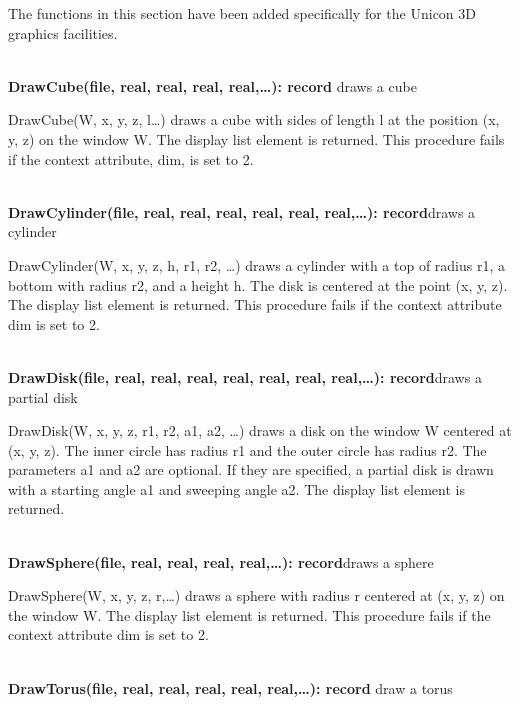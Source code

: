 \documentclass[letterpaper]{article}
\begin{document}
The functions in this section have been added specifically for the
Unicon 3D graphics facilities.

\noindent\hrulefill\\
\noindent\textsf{\textbf{DrawCube(file, real, real, real, real,{\dots}): record}} \hfill draws a cube


\bigskip

{
\textsf{DrawCube(W, x, y, z, l{\dots}) }draws a cube with sides of length l at the position (x, y, z) on the window W.
The display list element is returned. This procedure fails if the context attribute, dim, is set to 2. }


\noindent\hrulefill\\
\noindent\textsf{\textbf{DrawCylinder(file, real, real, real, real,
real, real,{\dots}): record}}\hfill draws a cylinder


\bigskip

\textsf{DrawCylinder(W, x, y, z, h, r1, r2, {\dots})} draws a
cylinder with a top of radius r1, a bottom with radius r2, and a
height h. The disk is centered at the point (x, y, z). The display
list element is returned. This procedure fails if the context
attribute dim is set to 2.

\noindent\hrulefill\\
\noindent\textsf{\textbf{DrawDisk(file, real, real, real, real, real,
	real, real,\dots): record}}\hfill draws a partial disk


\bigskip

\textsf{DrawDisk(W, x, y, z, r1, r2, a1, a2, {\dots})} draws
a disk on the window W centered at (x, y, z). The inner circle has
radius r1 and the outer circle has radius r2. The parameters a1 and a2
are optional. If they are specified, a partial disk is drawn with a
starting angle a1 and sweeping angle a2. The display list element is
returned.

\noindent\hrulefill\\
\noindent\textsf{\textbf{DrawSphere(file, real, real, real,
real,{\dots}): record}}\hfill draws a sphere

\textsf{DrawSphere(W, x, y, z, r,{\dots})} draws a sphere with
radius r centered at (x, y, z) on the window W. The display list
element is returned. This procedure fails if the context attribute dim
is set to 2.

\noindent\hrulefill\\
\noindent\textsf{\textbf{DrawTorus(file, real, real, real, real, real,{\dots}): record}}
\hfill draw a torus
\end{document}
